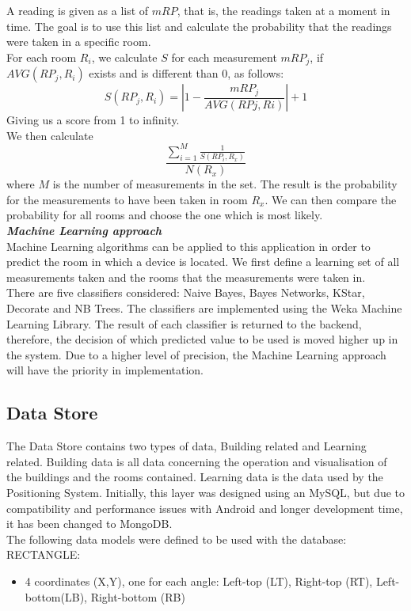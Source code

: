 A reading is given as a list of $mRP$, that is, the readings taken at a moment in time. The goal is to use this list and calculate the probability that the readings were taken in a specific room.\\
For each room $R_i$, we calculate $S$ for each measurement $mRP_j$, if $AVG(RP_j, R_i)$ exists and is different than 0, as follows:
$$S(RP_j, R_i) = | 1 - \frac{mRP_j}{AVG(RPj, Ri)}|+1$$
Giving us a score from 1 to infinity.\\
We then calculate 
$$\frac{\displaystyle\sum_{i=1}^{M} \frac{1}{S(RP_i, R_x)}}{N(R_x)}$$
where $M$ is the number of measurements in the set.
The result is the probability for the measurements to have been taken in room $R_x$.
We can then compare the probability for all rooms and choose the one which is most likely.
\\
\textit{\textbf{Machine Learning approach}}
\\
Machine Learning algorithms can be applied to this application in order to predict the room in which a device is located. We first define a learning set of all measurements taken and the rooms that the measurements were taken in.\\
There are five classifiers considered:
Naive Bayes, Bayes Networks, KStar, Decorate and NB Trees. The classifiers are implemented using the Weka Machine Learning Library. The result of each classifier is returned to the backend, therefore, the decision of which predicted value to be used is moved higher up in the system.
Due to a higher level of precision, the Machine Learning approach will have the priority in implementation.

\subsection{Data Store}
The Data Store contains two types of data, Building related and Learning related. 
Building data is all data concerning the operation and visualisation of the buildings and the rooms contained. Learning data is the data used by the Positioning System.
Initially, this layer was designed using an MySQL, but due to compatibility and performance issues with Android and longer development time, it has been changed to MongoDB.
\\
The following data models were defined to be used with the database:
\\
RECTANGLE:	
\begin{itemize}
	\item 4 coordinates (X,Y), one for each angle: Left-top (LT), Right-top (RT), Left-bottom(LB), Right-bottom (RB)
\end{itemize}

